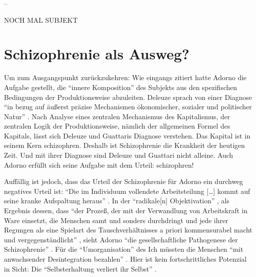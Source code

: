 \documentclass[12pt,
               paper=a4,
               twoside=false,
               onehalfspacing,
               bibliography=totoc,
               toc=graduated,
               ]{scrartcl}
\newcommand{\lips}{\dots\unkern}
\newcommand{\pc}[2]{\parencite[#1]{#2}}
\newcommand{\worries}[1]{\ifdraft{\textcolor{blue}{\texttt{(#1)}}}{}}
\newcommand{\dg}{Deleuze und Guattari\xspace}
\begin{document}


--

NOCH MAL SUBJEKT



\section{Schizophrenie als Ausweg?}

Um zum Ausgangspunkt zurückzukehren: Wie eingangs zitiert hatte Adorno
die Aufgabe gestellt, die "`innere Komposition"' \pc{261}{min} des
Subjekts aus den spezifischen Bedingungen der Produktionsweise
abzuleiten. Deleuze sprach von einer Diagnose "`in bezug auf äußerst
präzise Mechanismen ökonomischer, sozialer und politischer Natur"'
\pc{28}{schizg}. Nach Analyse eines zentralen Mechanismus des
Kapitalismus, der zentralen Logik der Produktionsweise, nämlich der
allgemeinen Formel des Kapitals, lässt sich Deleuze und Guattaris
Diagnose verstehen. Das Kapital ist in seinem Kern schizophren.
Deshalb ist Schizophrenie die Krankheit der heutigen Zeit. Und mit
ihrer Diagnose sind \dg nicht alleine. Auch Adorno erfüllt sich seine
Aufgabe mit dem Urteil: schizophren!

Auffällig ist jedoch, dass das Urteil der Schizophrenie für Adorno ein
durchweg negatives Urteil ist: "`Die im Individuum vollendete
Arbeitsteilung [\lips] kommt auf seine kranke Aufspaltung heraus"'
\pc{263}{min}. In der "`radikale[n] Objektivation"' \pc{263}{min}, als
Ergebnis dessen, dass "`der Prozeß, der mit der Verwandlung von
Arbeitskraft in Ware einsetzt, die Menschen samt und sonders
durchdringt und jede ihrer Regungen als eine Spielart des
Tauschverhältnisses a priori kommensurabel macht und
vergegenständlicht"' \pc{262}{min}, sieht Adorno "`die
gesellschaftliche Pathogenese der Schizophrenie"' \pc{263}{min}. Für
die "`Umorganisation"' \pc{263}{min} des Ich müssten die Menschen
"`mit anwachsender Desintegration bezahlen"' \pc{263}{min}. Hier ist
kein fortschrittliches Potenzial in Sicht: Die "`Selbsterhaltung
verliert ihr Selbst"' \pc{263}{min}.
\end{document}
